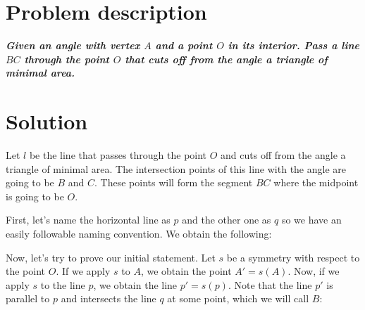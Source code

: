 \documentclass[11pt,a4paper]{article}
\begin{document}
\setlength{\parskip}{1em}


\section{Problem description}

\emph{\textbf{Given an angle with vertex $A$ and a point $O$ in its interior.
Pass a line $BC$ through the point $O$ that cuts off from the angle a triangle
of minimal area.}}

\begin{center}
\end{center}

\section{Solution}

Let $l$ be the line that passes through the point $O$ and cuts off from the
angle a triangle of minimal area. The intersection points of this line with the angle
are going to be $B$ and $C$. These points will form the segment $BC$ where the
midpoint is going to be $O$.

First, let's name the horizontal line as $p$ and the other one as $q$ so we have an easily
followable naming convention. We obtain the following:

\begin{center}
\end{center}

Now, let's try to prove our initial statement. Let $s$ be a symmetry with respect to the
point $O$. If we apply $s$ to $A$, we obtain the point $A' = s(A)$. Now, if we apply $s$ to
the line $p$, we obtain the line $p' = s(p)$. Note that the line $p'$ is parallel to $p$ and
intersects the line $q$ at some point, which we  will call $B$:


\begin{center}
\end{center}
\end{document}
